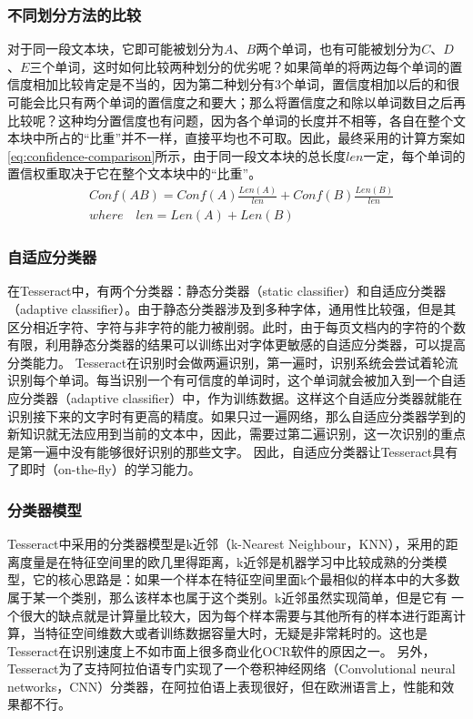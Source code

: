\subsubsection*{不同划分方法的比较}
对于同一段文本块，它即可能被划分为$A$、$B$两个单词，也有可能被划分为$C$、$D$、$E$三个单词，这时如何比较两种划分的优劣呢？如果简单的将两边每个单词的置信度相加比较肯定是不当的，因为第二种划分有3个单词，置信度相加以后的和很可能会比只有两个单词的置信度之和要大；那么将置信度之和除以单词数目之后再比较呢？这种均分置信度也有问题，因为各个单词的长度并不相等，各自在整个文本块中所占的“比重”并不一样，直接平均也不可取。因此，最终采用的计算方案如\autoref{eq:confidence-comparison}所示，由于同一段文本块的总长度$len$一定，每个单词的置信权重取决于它在整个文本块中的“比重”。
\begin{equation} \label{eq:confidence-comparison}
	\begin{split}
		&Conf(AB) = Conf(A)\frac{Len(A)}{len} + Conf(B)\frac{Len(B)}{len} \\
		&where \quad len=Len(A) + Len(B)
	\end{split}
\end{equation}

\subsubsection*{自适应分类器}
在Tesseract中，有两个分类器：静态分类器（static classifier）和自适应分类器（adaptive classifier）。由于静态分类器涉及到多种字体，通用性比较强，但是其区分相近字符、字符与非字符的能力被削弱。此时，由于每页文档内的字符的个数有限，利用静态分类器的结果可以训练出对字体更敏感的自适应分类器，可以提高分类能力。%
Tesseract在识别时会做两遍识别，第一遍时，识别系统会尝试着轮流识别每个单词。每当识别一个有可信度的单词时，这个单词就会被加入到一个自适应分类器（adaptive classifier）中，作为训练数据。这样这个自适应分类器就能在识别接下来的文字时有更高的精度。如果只过一遍网络，那么自适应分类器学到的新知识就无法应用到当前的文本中，因此，需要过第二遍识别，这一次识别的重点是第一遍中没有能够很好识别的那些文字。%
因此，自适应分类器让Tesseract具有了即时（on-the-fly）的学习能力。

\subsubsection*{分类器模型}
Tesseract中采用的分类器模型是k近邻（k-Nearest Neighbour，KNN），采用的距离度量是在特征空间里的欧几里得距离，k近邻是机器学习中比较成熟的分类模型，它的核心思路是：如果一个样本在特征空间里面k个最相似的样本中的大多数属于某一个类别，那么该样本也属于这个类别。k近邻虽然实现简单，但是它有 一个很大的缺点就是计算量比较大，因为每个样本需要与其他所有的样本进行距离计算，当特征空间维数大或者训练数据容量大时，无疑是非常耗时的。这也是Tesseract在识别速度上不如市面上很多商业化OCR软件的原因之一。
另外，Tesseract为了支持阿拉伯语专门实现了一个卷积神经网络（Convolutional neural networks，CNN）分类器，在阿拉伯语上表现很好，但在欧洲语言上，性能和效果都不行。%

